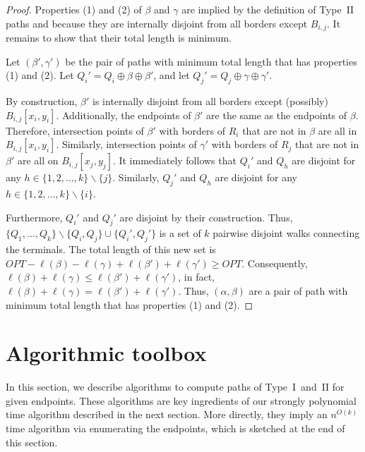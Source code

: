 \documentclass[11pt,twoside]{article}
\newcommand{\opt}[1]{Q_{#1}}
\newcommand{\region}[1]{R_{#1}}
\newcommand{\border}[2]{B_{#1,#2}}
\newcommand{\len}[1]{\ell(#1)}
\begin{document}
\begin{proof}
Properties (1) and (2) of $\beta$ and $\gamma$ are implied by the definition of Type~II paths and because they are internally disjoint from all borders except $\border{i}{j}$.  It remains to show that their total length is minimum.

Let $(\beta',\gamma')$ be the pair of paths with minimum total length that has properties (1) and (2). 
Let $\opt{i}' = \opt{i}\oplus \beta \oplus \beta'$, and let $\opt{j}' = \opt{j} \oplus \gamma \oplus \gamma'$.

By construction, $\beta'$ is internally disjoint from all borders except (possibly) $\border{i}{j}[x_i, y_i]$.  Additionally, the endpoints of $\beta'$ are the same as the endpoints of $\beta$.
Therefore, intersection points of $\beta'$ with borders of $\region{i}$ that are not in $\beta$ are all in $\border{i}{j}[x_i, y_i]$.
Similarly, intersection points of $\gamma'$ with borders of $\region{j}$ that are not in $\beta'$ are all on $\border{i}{j}[x_j, y_j]$.
It immediately follows that $\opt{i}'$ and $\opt{h}$ are disjoint for any $h\in \{1,2,\ldots, k\}\backslash \{j\}$.
Similarly, $\opt{j}'$ and $\opt{h}$ are disjoint for any $h\in \{1,2,\ldots, k\}\backslash \{i\}$.

Furthermore, $\opt{i}'$ and $\opt{j}'$ are disjoint by their construction.  Thus, $\{\opt{1}, \ldots, \opt{k}\}\backslash \{\opt{i},\opt{j}\} \cup \{\opt{i}', \opt{j}'\}$ is a set of $k$ pairwise disjoint walks connecting the terminals.  The total length of this new set is $OPT - \len{\beta} - \len{\gamma} + \len{\beta'} + \len{\gamma'} \geq OPT$.  Consequently, $\len{\beta} + \len{\gamma} \leq \len{\beta'} + \len{\gamma'}$, in fact, $\len{\beta} + \len{\gamma} = \len{\beta'} + \len{\gamma'}$.  Thus, $(\alpha, \beta)$ are a pair of path with minimum total length that has properties (1) and (2).
\end{proof}



\section{Algorithmic toolbox} 

In this section, we describe algorithms to compute paths of Type~I~and~II for given endpoints.
These algorithms are key ingredients of our strongly polynomial time algorithm described in the next section.
More directly, they imply an $n^{O(k)}$ time algorithm via enumerating the endpoints, which is sketched at the end of this section.
\end{document}
